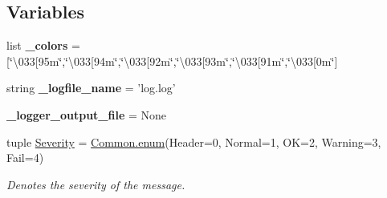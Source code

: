 \subsection*{Variables}
\begin{DoxyCompactItemize}
\item 
\hypertarget{namespaceLog_a0a9b366c6bf4ddf6cc47fa89931b3d02}{list {\bfseries \-\_\-colors} = \mbox{[}\char`\"{}\textbackslash{}033\mbox{[}95m\char`\"{},\char`\"{}\textbackslash{}033\mbox{[}94m\char`\"{},\char`\"{}\textbackslash{}033\mbox{[}92m\char`\"{},\char`\"{}\textbackslash{}033\mbox{[}93m\char`\"{},\char`\"{}\textbackslash{}033\mbox{[}91m\char`\"{},\char`\"{}\textbackslash{}033\mbox{[}0m\char`\"{}\mbox{]}}\label{namespaceLog_a0a9b366c6bf4ddf6cc47fa89931b3d02}

\item 
\hypertarget{namespaceLog_a63df3fdf96b26455c708a769c32c9d1a}{string {\bfseries \-\_\-logfile\-\_\-name} = 'log.\-log'}\label{namespaceLog_a63df3fdf96b26455c708a769c32c9d1a}

\item 
\hypertarget{namespaceLog_aa8eb2cbb065381bf64df15ddcd90765c}{{\bfseries \-\_\-logger\-\_\-output\-\_\-file} = None}\label{namespaceLog_aa8eb2cbb065381bf64df15ddcd90765c}

\item 
\hypertarget{namespaceLog_a92b54749abc1d47f69da4f070fffe94f}{tuple \hyperlink{namespaceLog_a92b54749abc1d47f69da4f070fffe94f}{Severity} = \hyperlink{namespaceCommon_a4392838fb004565ef65e9e93544a80b7}{Common.\-enum}(Header=0, Normal=1, O\-K=2, Warning=3, Fail=4)}\label{namespaceLog_a92b54749abc1d47f69da4f070fffe94f}

\begin{DoxyCompactList}\small\item\em Denotes the severity of the message. \end{DoxyCompactList}\end{DoxyCompactItemize}


